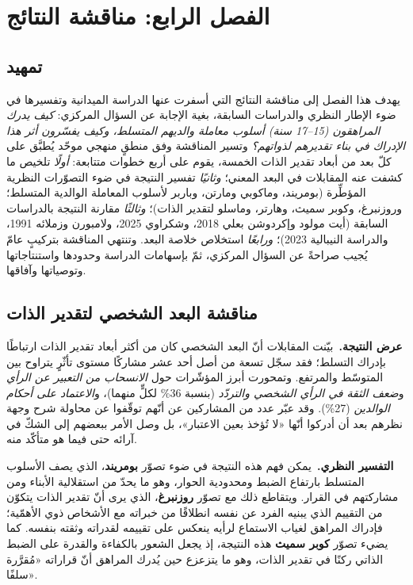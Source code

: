 \chapter*{الفصل الرابع: مناقشة النتائج}

\section*{تمهيد}
يهدف هذا الفصل إلى مناقشة النتائج التي أسفرت عنها الدراسة الميدانية وتفسيرها في ضوء الإطار
النظري والدراسات السابقة، بغية الإجابة عن السؤال المركزي: \emph{كيف يدرك المراهقون (15--17 سنة)
أسلوب معاملة والديهم المتسلط، وكيف يفسّرون أثر هذا الإدراك في بناء تقديرهم لذواتهم؟} وتسير
المناقشة وفق منطقٍ منهجي موحّد يُطبَّق على كلّ بعد من أبعاد تقدير الذات الخمسة، يقوم على أربع
خطوات متتابعة: \emph{أولًا} تلخيص ما كشفت عنه المقابلات في البعد المعني؛ \emph{وثانيًا} تفسير
النتيجة في ضوء التصوّرات النظرية المؤطِّرة (بومريند، وماكوبي ومارتن، وباربر لأسلوب المعاملة
الوالدية المتسلط؛ وروزنبرغ، وكوبر سميث، وهارتر، وماسلو لتقدير الذات)؛ \emph{وثالثًا} مقارنة
النتيجة بالدراسات السابقة (أيت مولود وإكردوشن بعلي 2018، وشكراوي 2025، ولامبورن وزملائه 1991،
والدراسة النيبالية 2023)؛ \emph{ورابعًا} استخلاص خلاصة البعد. وتنتهي المناقشة بتركيبٍ عامّ
يُجيب صراحةً عن السؤال المركزي، ثمّ بإسهامات الدراسة وحدودها واستنتاجاتها وتوصياتها وآفاقها.

\section{مناقشة البعد الشخصي لتقدير الذات}
\noindent\textbf{عرض النتيجة.}\ بيّنت المقابلات أنّ البعد الشخصي كان من أكثر أبعاد تقدير الذات
ارتباطًا بإدراك التسلط؛ فقد سجّل تسعة من أصل أحد عشر مشاركًا مستوى تأثّرٍ يتراوح بين المتوسّط
والمرتفع. وتمحورت أبرز المؤشّرات حول \emph{الانسحاب من التعبير عن الرأي} و\emph{ضعف الثقة في
الرأي الشخصي والتردّد} (بنسبة 36\% لكلٍّ منهما)، و\emph{الاعتماد على أحكام الوالدين} (27\%). وقد
عبّر عدد من المشاركين عن أنّهم توقّفوا عن محاولة شرح وجهة نظرهم بعد أن أدركوا أنّها «لا تُؤخذ بعين
الاعتبار»، بل وصل الأمر ببعضهم إلى الشكّ في آرائه حتى فيما هو متأكّد منه.

\noindent\textbf{التفسير النظري.}\ يمكن فهم هذه النتيجة في ضوء تصوّر \textbf{بومريند}، الذي يصف
الأسلوب المتسلط بارتفاع الضبط ومحدودية الحوار، وهو ما يحدّ من استقلالية الأبناء ومن مشاركتهم في
القرار. ويتقاطع ذلك مع تصوّر \textbf{روزنبرغ}، الذي يرى أنّ تقدير الذات يتكوّن من التقييم الذي
يبنيه الفرد عن نفسه انطلاقًا من خبراته مع الأشخاص ذوي الأهمّية؛ فإدراك المراهق لغياب الاستماع
لرأيه ينعكس على تقييمه لقدراته وثقته بنفسه. كما يضيء تصوّر \textbf{كوبر سميث} هذه النتيجة، إذ
يجعل الشعور بالكفاءة والقدرة على الضبط الذاتي ركنًا في تقدير الذات، وهو ما يتزعزع حين يُدرك
المراهق أنّ قراراته «مُقرَّرة سلفًا».

